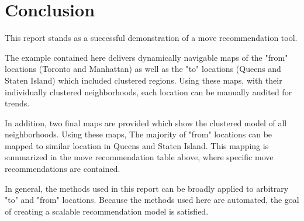 \documentclass[11pt]{article}
\begin{document}
    

    \section{Conclusion}\label{conclusion}

This report stands as a successful demonstration of a move
recommendation tool.

The example contained here delivers dynamically navigable maps of the
"from" locations (Toronto and Manhattan) as well as the "to" locations
(Queens and Staten Island) which included clustered regions. Using these
maps, with their individually clustered neighborhoods, each location can
be manually audited for trends.

In addition, two final maps are provided which show the clustered model
of all neighborhoods. Using these maps, The majority of "from" locations
can be mapped to similar location in Queens and Staten Island. This
mapping is summarized in the move recommendation table above, where
specific move recommendations are contained.

In general, the methods used in this report can be broadly applied to
arbitrary "to" and "from" locations. Because the methods used here are
automated, the goal of creating a scalable recommendation model is
satisfied.


    
    
    
    
\end{document}
